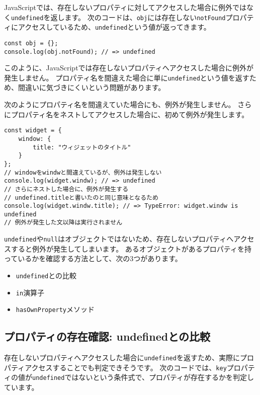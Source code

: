 JavaScriptでは、存在しないプロパティに対してアクセスした場合に例外ではなく\texttt{undefined}を返します。
次のコードは、\texttt{obj}には存在しない\texttt{notFound}プロパティにアクセスしているため、\texttt{undefined}という値が返ってきます。

\begin{lstlisting}
const obj = {};
console.log(obj.notFound); // => undefined
\end{lstlisting}

このように、JavaScriptでは存在しないプロパティへアクセスした場合に例外が発生しません。
プロパティ名を間違えた場合に単に\texttt{undefined}という値を返すため、間違いに気づきにくいという問題があります。

次のようにプロパティ名を間違えていた場合にも、例外が発生しません。
さらにプロパティ名をネストしてアクセスした場合に、初めて例外が発生します。

\begin{lstlisting}
const widget = {
    window: {
        title: "ウィジェットのタイトル"
    }
};
// windowをwindwと間違えているが、例外は発生しない
console.log(widget.windw); // => undefined
// さらにネストした場合に、例外が発生する
// undefined.titleと書いたのと同じ意味となるため
console.log(widget.windw.title); // => TypeError: widget.windw is undefined
// 例外が発生した文以降は実行されません
\end{lstlisting}

\texttt{undefined}や\texttt{null}はオブジェクトではないため、存在しないプロパティへアクセスすると例外が発生してしまいます。
あるオブジェクトがあるプロパティを持っているかを確認する方法として、次の3つがあります。

\begin{itemize}
\item
  \texttt{undefined}との比較
\item
  \texttt{in}演算子
\item
  \texttt{hasOwnProperty}メソッド
\end{itemize}

\hypertarget{compare-to-undefined}{%
\subsection{プロパティの存在確認:
undefinedとの比較}\label{compare-to-undefined}}

存在しないプロパティへアクセスした場合に\texttt{undefined}を返すため、実際にプロパティアクセスすることでも判定できそうです。
次のコードでは、\texttt{key}プロパティの値が\texttt{undefined}ではないという条件式で、プロパティが存在するかを判定しています。

